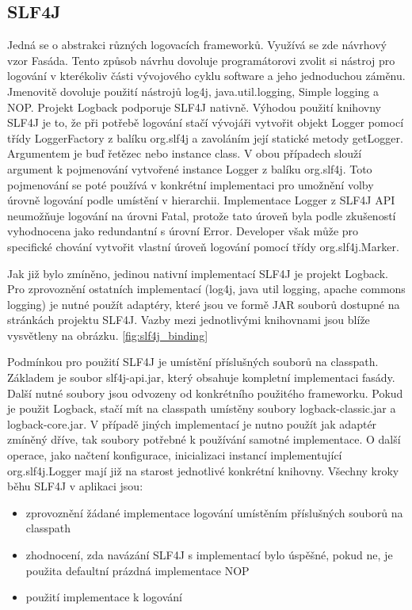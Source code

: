 \documentclass[ing,male,java,dept460]{diploma}		%
\begin{document}
\subsection{SLF4J}
Jedná se o abstrakci různých logovacích frameworků. Využívá se zde návrhový vzor Fasáda. Tento způsob návrhu dovoluje programátorovi zvolit si nástroj pro logování v kterékoliv části vývojového cyklu software a jeho jednoduchou záměnu. Jmenovitě dovoluje použití nástrojů log4j, java.util.logging, Simple logging a NOP. Projekt Logback podporuje SLF4J nativně. Výhodou použití knihovny SLF4J je to, že při potřebě logování stačí vývojáři vytvořit objekt Logger pomocí třídy LoggerFactory z balíku org.slf4j a zavoláním její statické metody getLogger. Argumentem je buď řetězec nebo instance class. V obou případech slouží argument k pojmenování vytvořené instance Logger z balíku org.slf4j. Toto pojmenování se poté používá v konkrétní implementaci pro umožnění volby úrovně logování podle umístění v hierarchii. Implementace Logger z SLF4J API neumožňuje logování na úrovni Fatal, protože tato úroveň byla podle zkušeností vyhodnocena jako redundantní s úrovní Error. Developer však může pro specifické chování vytvořit vlastní úroveň logování pomocí třídy org.slf4j.Marker.
\par Jak již bylo zmíněno, jedinou nativní implementací SLF4J je projekt Logback. Pro zprovoznění ostatních implementací (log4j, java util logging, apache commons logging) je nutné použít adaptéry, které jsou ve formě JAR souborů dostupné na stránkách projektu SLF4J. Vazby mezi jednotlivými knihovnami jsou blíže vysvětleny na obrázku. \ref{fig:slf4j_binding}
\par Podmínkou pro použití SLF4J je umístění příslušných souborů na classpath. Základem je soubor slf4j-api.jar, který obsahuje kompletní implementaci fasády. Další nutné soubory jsou odvozeny od konkrétního použitého frameworku. Pokud je použit Logback, stačí mít na classpath umístěny soubory logback-classic.jar a logback-core.jar. V případě jiných implementací je nutno použít jak adaptér zmíněný dříve, tak soubory potřebné k používání samotné implementace. O další operace, jako načtení konfigurace, inicializaci instancí implementující org.slf4j.Logger mají již na starost jednotlivé konkrétní knihovny. Všechny kroky běhu SLF4J v aplikaci jsou:
\begin{itemize}
  \item zprovoznění žádané implementace logování umístěním příslušných souborů na classpath
  \item zhodnocení, zda navázání SLF4J s implementací bylo úspěšné, pokud ne, je použita defaultní prázdná implementace NOP
  \item použití implementace k logování
\end{itemize}
\end{document}
